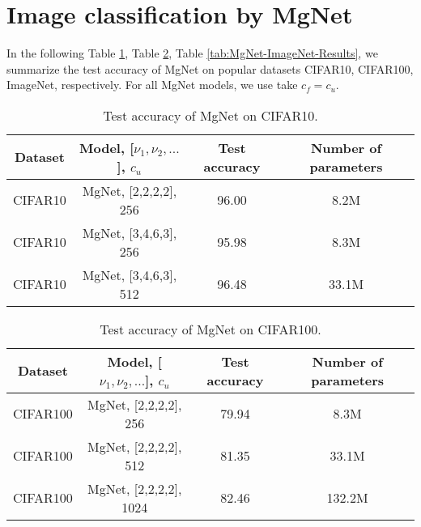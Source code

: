 \section{Image classification by MgNet}\label{sec:CNN-Results}
In the following Table \ref{tab:MgNet-CIFAR10-Results}, Table \ref{tab:MgNet-CIFAR100-Results}, Table \ref{tab:MgNet-ImageNet-Results}, we summarize the test accuracy of MgNet on popular datasets CIFAR10, CIFAR100, ImageNet, respectively. For all MgNet models, we use take $c_f=c_u$.

\newpage
\begin{table}[!htbp]
	\begin{center}
		\begin{tabular}{|c|c|c|c|}
			\hline
			Dataset     & Model, [$\nu_1,\nu_2,...$], $c_u$                  &  Test accuracy   &  Number of parameters \tabularnewline
			\hline
			CIFAR10     &MgNet, [2,2,2,2], 256      &  96.00      &   8.2M      \tabularnewline
			\hline
			CIFAR10     &MgNet, [3,4,6,3], 256      &  95.98      &   8.3M      \tabularnewline
			\hline
			CIFAR10     &MgNet, [3,4,6,3], 512      &  96.48      &   33.1M     \tabularnewline
			\hline
		\end{tabular}
	\end{center}
	\label{tab:MgNet-CIFAR10-Results}
	\caption{Test accuracy of MgNet on CIFAR10.}
\end{table}


\begin{table}[!htbp]
	\begin{center}
		\begin{tabular}{|c|c|c|c|}
			\hline
			Dataset     & Model, [$\nu_1,\nu_2,...$], $c_u$                  &  Test accuracy   &  Number of parameters \tabularnewline
			\hline
			CIFAR100     &MgNet, [2,2,2,2], 256            &  79.94      &   8.3M      \tabularnewline
			\hline
			CIFAR100     &MgNet, [2,2,2,2], 512            &  81.35      &   33.1M      \tabularnewline
			\hline
			CIFAR100     &MgNet, [2,2,2,2], 1024           &  82.46      &   132.2M      \tabularnewline
			\hline
		\end{tabular}
	\end{center}
	\label{tab:MgNet-CIFAR100-Results}
	\caption{Test accuracy of MgNet on CIFAR100.}
\end{table}

